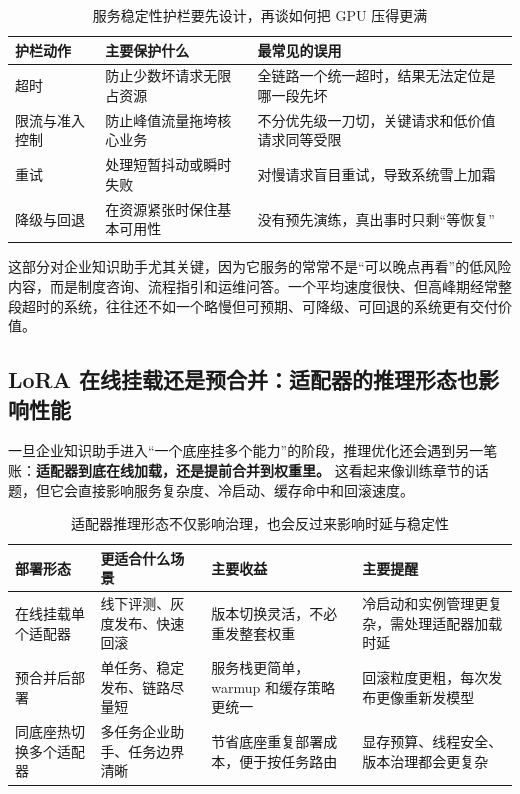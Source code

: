 \begin{table}[H]
\centering
\small
\begin{tabularx}{\textwidth}{>{\raggedright\arraybackslash}p{2.8cm}>{\raggedright\arraybackslash}p{3cm}>{\raggedright\arraybackslash}X}
\toprule
\textbf{护栏动作} & \textbf{主要保护什么} & \textbf{最常见的误用} \\
\midrule
超时 & 防止少数坏请求无限占资源 & 全链路一个统一超时，结果无法定位是哪一段先坏 \\
限流与准入控制 & 防止峰值流量拖垮核心业务 & 不分优先级一刀切，关键请求和低价值请求同等受限 \\
重试 & 处理短暂抖动或瞬时失败 & 对慢请求盲目重试，导致系统雪上加霜 \\
降级与回退 & 在资源紧张时保住基本可用性 & 没有预先演练，真出事时只剩“等恢复” \\
\bottomrule
\end{tabularx}
\caption{服务稳定性护栏要先设计，再谈如何把 GPU 压得更满}
\label{tab:serving-guardrails}
\end{table}

这部分对企业知识助手尤其关键，因为它服务的常常不是“可以晚点再看”的低风险内容，而是制度咨询、流程指引和运维问答。一个平均速度很快、但高峰期经常整段超时的系统，往往还不如一个略慢但可预期、可降级、可回退的系统更有交付价值。

\subsection{LoRA 在线挂载还是预合并：适配器的推理形态也影响性能}
一旦企业知识助手进入“一个底座挂多个能力”的阶段，推理优化还会遇到另一笔账：\textbf{适配器到底在线加载，还是提前合并到权重里。} 这看起来像训练章节的话题，但它会直接影响服务复杂度、冷启动、缓存命中和回滚速度。

\begin{table}[H]
\centering
\small
\begin{tabularx}{\textwidth}{>{\raggedright\arraybackslash}p{3cm}>{\raggedright\arraybackslash}p{3cm}>{\raggedright\arraybackslash}p{2.8cm}>{\raggedright\arraybackslash}X}
\toprule
\textbf{部署形态} & \textbf{更适合什么场景} & \textbf{主要收益} & \textbf{主要提醒} \\
\midrule
在线挂载单个适配器 & 线下评测、灰度发布、快速回滚 & 版本切换灵活，不必重发整套权重 & 冷启动和实例管理更复杂，需处理适配器加载时延 \\
预合并后部署 & 单任务、稳定发布、链路尽量短 & 服务栈更简单，warmup 和缓存策略更统一 & 回滚粒度更粗，每次发布更像重新发模型 \\
同底座热切换多个适配器 & 多任务企业助手、任务边界清晰 & 节省底座重复部署成本，便于按任务路由 & 显存预算、线程安全、版本治理都会更复杂 \\
\bottomrule
\end{tabularx}
\caption{适配器推理形态不仅影响治理，也会反过来影响时延与稳定性}
\label{tab:adapter-serving-forms}
\end{table}

